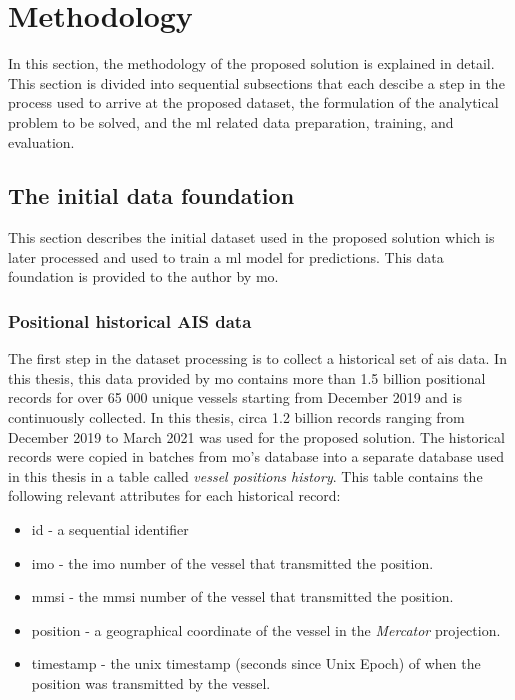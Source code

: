 \chapter{Methodology}

In this section, the methodology of the proposed solution is explained in detail. This section is divided into sequential subsections that each descibe a step in the process used to arrive at the proposed dataset, the formulation of the analytical problem to be solved, and the \acrfull{ml} related data preparation, training, and evaluation.

\section{The initial data foundation}

This section describes the initial dataset used in the proposed solution which is later processed and used to train a \acrshort{ml} model for predictions. This data foundation is provided to the author by \acrfull{mo}.

\subsection{Positional historical AIS data}

The first step in the dataset processing is to collect a historical set of \acrshort{ais} data. In this thesis, this data provided by \acrshort{mo} contains more than 1.5 billion positional records for over 65 000 unique vessels starting from December 2019 and is continuously collected. In this thesis, circa 1.2 billion records ranging from December 2019 to March 2021 was used for the proposed solution. The historical records were copied in batches from \acrshort{mo}'s database into a separate database used in this thesis in a table called \textit{vessel positions history}. This table contains the following relevant attributes for each historical record:

\begin{itemize}
    \item id - a sequential identifier
    \item imo - the \acrshort{imo} number of the vessel that transmitted the position.
    \item mmsi - the \acrshort{mmsi} number of the vessel that transmitted the position.
    \item position - a geographical coordinate of the vessel in the \textit{Mercator} projection.
    \item timestamp - the unix timestamp (seconds since Unix Epoch) of when the position was transmitted by the vessel.
\end{itemize}

